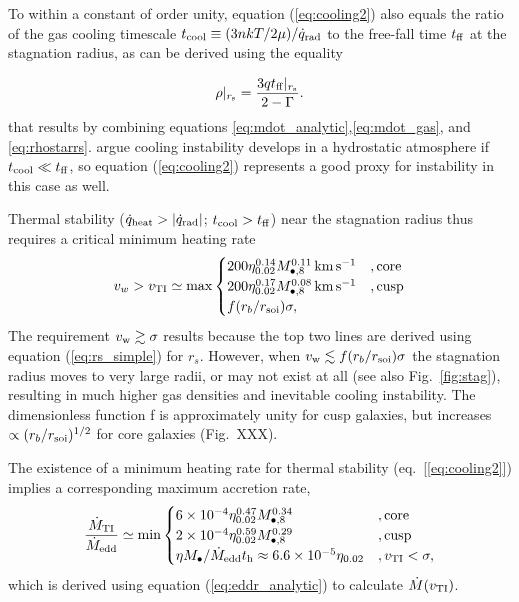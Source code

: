 \documentclass[usenatbib,fleqn]{mn2e}
\newcommand{\tff}{t_{\rm ff}}
\begin{document}
To within a constant of order unity, equation (\ref{eq:cooling2}) also
equals the ratio of the gas cooling timescale $t_{\rm cool} \equiv (3n
kT/2 \mu)/\dot{q}_{\rm rad}$ to the free-fall time $t_{\rm ff}$ at the
stagnation radius, as can be derived using the equality

\begin{align}
\rho|_{r_{\rm s}}=\frac{3 q\tff|_{r_{\rm s}}}{2-\Gamma}.
\label{eq:rhors2}
\end{align}
that results by combining equations
\eqref{eq:mdot_analytic},\eqref{eq:mdot_gas}, and
\eqref{eq:rhostarrs}.  \citet{McCourt+12} argue cooling instability
develops in a hydrostatic atmosphere if $t_{\rm cool} \ll t_{\rm ff}$,
so equation (\ref{eq:cooling2}) represents a good proxy for
instability in this case as well.

Thermal stability ($\dot{q}_{\rm heat} > |\dot{q}_{\rm rad}|$; $t_{\rm
  cool} > t_{\rm ff}$) near the stagnation radius thus requires a
critical minimum heating rate
\begin{align}
v_{w} > v_{\rm TI} \simeq
  {\rm max}\begin{cases}
   200 \eta_{0.02}^{0.14} M_{\bullet,8}^{0.11}\,{\rm km\,s^{-1}}  &, \text{core}\\
   200 \eta_{0.02}^{0.17} M_{\bullet,8}^{0.08}\,{\rm km\,s^{-1}}   &, \text{cusp}\\
f(r_b/r_{\rm soi})\sigma,     
  \end{cases}
  \label{eq:cooling3}
\end{align}
The requirement $v_{\rm w} \gtrsim \sigma$ results because the top two lines are derived using equation (\ref{eq:rs_simple}) for $r_s$.  However, when $v_{\rm w} \lesssim f(r_b/r_{\rm soi})\sigma$ the stagnation radius moves to very large radii, or may not exist at all (see also Fig.~\ref{fig:stag}), resulting in much higher gas densities and inevitable cooling instability.  The dimensionless function f is approximately unity for cusp galaxies, but increases $\propto (r_b/r_{\rm soi})^{1/2}$ for core galaxies (Fig.~XXX).  

The existence of a minimum heating rate for thermal stability (eq.~[\ref{eq:cooling2}]) implies a corresponding maximum accretion rate,
\begin{align}
\frac{\dot{M}_{\rm TI}}{\dot{M}_{\rm edd}} \simeq
  {\rm min}\begin{cases}
   6\times 10^{-4} \eta_{0.02}^{0.47} M_{\bullet,8}^{0.34} &, \text{core}\\
   2\times 10^{-4} \eta_{0.02}^{0.59} M_{\bullet,8}^{0.29}    &, \text{cusp}\\
\eta M_{\bullet}/\dot{M}_{\rm edd}t_{\rm h} \approx 6. 6\times 10^{-5}\eta_{0.02}&, v_{\rm TI} < \sigma,
  \end{cases}
  \label{eq:Mdotmax}
\end{align}
which is derived using equation (\ref{eq:eddr_analytic}) to calculate $\dot{M}(v_{\rm TI})$.
\end{document}
